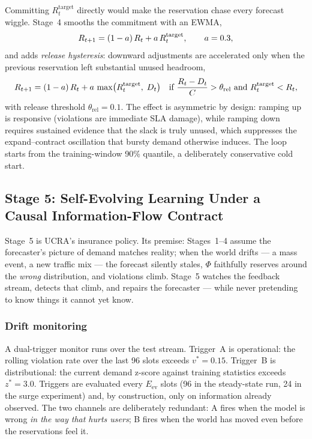 Committing $R^{\text{target}}_t$ directly would make the reservation
chase every forecast wiggle. Stage~4 smooths the commitment with an
EWMA,
\begin{equation}
R_{t+1} = (1-a)\,R_t + a\,R^{\text{target}}_t,
\qquad a = 0.3,
\label{eq:ewma}
\end{equation}
and adds \emph{release hysteresis}: downward adjustments are
accelerated only when the previous reservation left substantial
unused headroom,
\begin{equation}
R_{t+1} = (1-a)\,R_t + a\,\max\bigl(R^{\text{target}}_t,\;
D_t\bigr)
\quad \text{if } \frac{R_t - D_t}{C} > \theta_{\text{rel}}
\text{ and } R^{\text{target}}_t < R_t,
\label{eq:hysteresis}
\end{equation}
with release threshold $\theta_{\text{rel}} = 0.1$. The effect is
asymmetric by design: ramping up is responsive (violations are
immediate SLA damage), while ramping down requires sustained evidence
that the slack is truly unused, which suppresses the
expand--contract oscillation that bursty demand otherwise induces.
The loop starts from the training-window 90\% quantile, a
deliberately conservative cold start.

\subsection{Stage 5: Self-Evolving Learning Under a Causal
Information-Flow Contract}
\label{sec:stage5}

Stage~5 is UCRA's insurance policy. Its premise: Stages~1--4 assume
the forecaster's picture of demand matches reality; when the world
drifts --- a mass event, a new traffic mix --- the forecast silently
stales, $\Phi$ faithfully reserves around the \emph{wrong}
distribution, and violations climb. Stage~5 watches the feedback
stream, detects that climb, and repairs the forecaster --- while
never pretending to know things it cannot yet know.

\subsubsection{Drift monitoring}

A dual-trigger monitor runs over the test stream. Trigger~A is
operational: the rolling violation rate over the last 96 slots
exceeds $v^* = 0.15$. Trigger~B is distributional: the current demand
z-score against training statistics exceeds $z^* = 3.0$. Triggers are
evaluated every $E_{\text{ev}}$ slots (96 in the steady-state run,
24 in the surge experiment) and, by construction, only on information
already observed. The two channels are deliberately redundant: A
fires when the model is wrong \emph{in the way that hurts users}; B
fires when the world has moved even before the reservations feel it.


